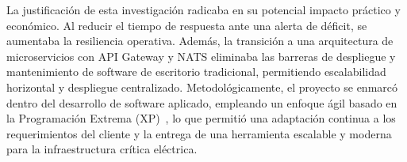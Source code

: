 La justificación de esta investigación radicaba en su potencial impacto práctico y económico. Al reducir el tiempo de respuesta ante una alerta de déficit, se aumentaba la resiliencia operativa. Además, la transición a una arquitectura de microservicios con API Gateway y NATS eliminaba las barreras de despliegue y mantenimiento de software de escritorio tradicional, permitiendo escalabilidad horizontal y despliegue centralizado. Metodológicamente, el proyecto se enmarcó dentro del desarrollo de software aplicado, empleando un enfoque ágil basado en la Programación Extrema (XP)~\citep{beck2000}, lo que permitió una adaptación continua a los requerimientos del cliente y la entrega de una herramienta escalable y moderna para la infraestructura crítica eléctrica.